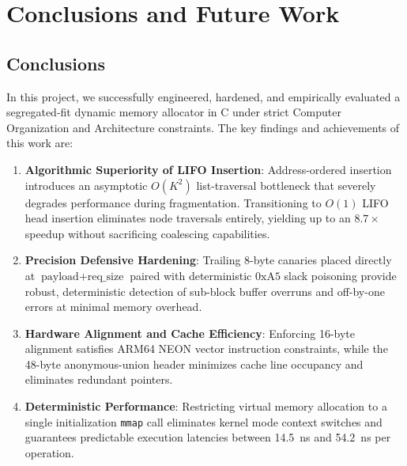 \documentclass[a4paper,11pt]{report}
\begin{document}
\chapter{Conclusions and Future Work}
\label{chap:conclusions}

\section{Conclusions}
In this project, we successfully engineered, hardened, and empirically evaluated a segregated-fit dynamic memory allocator in C under strict Computer Organization and Architecture constraints. The key findings and achievements of this work are:
\begin{enumerate}
    \item \textbf{Algorithmic Superiority of LIFO Insertion}: Address-ordered insertion introduces an asymptotic $O(K^2)$ list-traversal bottleneck that severely degrades performance during fragmentation. Transitioning to $O(1)$ LIFO head insertion eliminates node traversals entirely, yielding up to an $8.7\times$ speedup without sacrificing coalescing capabilities.
    \item \textbf{Precision Defensive Hardening}: Trailing 8-byte canaries placed directly at $\text{payload} + \text{req\_size}$ paired with deterministic $0\text{xA5}$ slack poisoning provide robust, deterministic detection of sub-block buffer overruns and off-by-one errors at minimal memory overhead.
    \item \textbf{Hardware Alignment and Cache Efficiency}: Enforcing 16-byte alignment satisfies ARM64 NEON vector instruction constraints, while the 48-byte anonymous-union header minimizes cache line occupancy and eliminates redundant pointers.
    \item \textbf{Deterministic Performance}: Restricting virtual memory allocation to a single initialization \texttt{mmap} call eliminates kernel mode context switches and guarantees predictable execution latencies between 14.5~ns and 54.2~ns per operation.
\end{enumerate}
\end{document}
